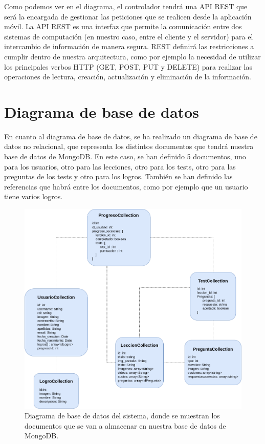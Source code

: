 Como podemos ver en el diagrama, el controlador tendrá una API REST que será la encargada de gestionar las peticiones que se realicen desde la aplicación móvil. La API REST es una interfaz que permite la comunicación entre dos sistemas de computación (en nuestro caso, entre el cliente y el servidor) para
el intercambio de información de manera segura. REST definirá las restricciones a cumplir dentro de nuestra arquitectura, como por ejemplo la necesidad de utilizar los principales verbos HTTP (GET, POST, PUT y DELETE) para realizar las operaciones de lectura, creación, actualización y eliminación de la información.

\section{Diagrama de base de datos}
En cuanto al diagrama de base de datos, se ha realizado un diagrama de base de datos no relacional, que representa los distintos documentos 
que tendrá nuestra base de datos de MongoDB. En este caso, se han definido 5 documentos, uno para los usuarios, otro para las lecciones, otro para los tests, otro para las preguntas de los tests y otro para
los logros. También se han definido las referencias que habrá entre los documentos, como por ejemplo que un usuario tiene varios logros.

\begin{figure}[H]
    \centering
    \centerline{\includegraphics[width=\textwidth]{imagenes/c6/bbdd.png}}
    \caption{Diagrama de base de datos del sistema, donde se muestran los documentos que se van a almacenar en nuestra base de datos de MongoDB.}
    \label{fig:diagramadearquitectura}    
\end{figure}

